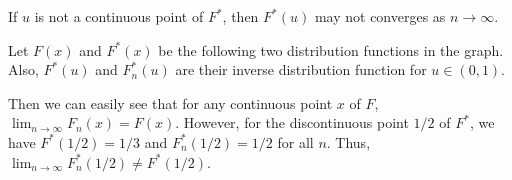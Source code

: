 \begin{example}
If $u$ is not a continuous point of $F^*$, then $F^*(u)$ may not converges as $n\to \infty$.

Let $F(x)$ and $F^*(x)$ be the following two distribution functions in the graph. Also, $F^*(u)$ and $F^*_n(u)$ are their inverse distribution function for $u\in (0,1)$.

Then we can easily see that for any continuous point $x$ of $F$, $\lim_{n\to\infty}F_n(x) = F(x)$. However, for the discontinuous point $1/2$ of $F^*$, we have $F^*(1/2) = 1/3$ and $F^*_n(1/2) = 1/2$ for all $n$. Thus, $\lim_{n\to\infty} F^*_n(1/2) \neq F^*(1/2)$.
%
%
%
%
%
%
%
%
%
%
%
%
%
%
%
%
%
%
%
%
%
%
%
%
%
%
%
%
%
%
%
%
%
%
%
%
%
%
%
%
%
%
%
%
%




\end{example}
